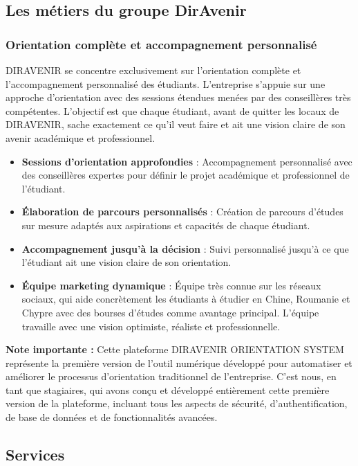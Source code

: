 \documentclass[12pt,a4paper]{report}
\begin{document}
\subsection{Les métiers du groupe DirAvenir}

\subsubsection{Orientation complète et accompagnement personnalisé}

DIRAVENIR se concentre exclusivement sur l'orientation complète et l'accompagnement personnalisé des étudiants. L'entreprise s'appuie sur une approche d'orientation avec des sessions étendues menées par des conseillères très compétentes. L'objectif est que chaque étudiant, avant de quitter les locaux de DIRAVENIR, sache exactement ce qu'il veut faire et ait une vision claire de son avenir académique et professionnel.

\begin{itemize}
    \item \textbf{Sessions d'orientation approfondies} : Accompagnement personnalisé avec des conseillères expertes pour définir le projet académique et professionnel de l'étudiant.
    \item \textbf{Élaboration de parcours personnalisés} : Création de parcours d'études sur mesure adaptés aux aspirations et capacités de chaque étudiant.
    \item \textbf{Accompagnement jusqu'à la décision} : Suivi personnalisé jusqu'à ce que l'étudiant ait une vision claire de son orientation.
    \item \textbf{Équipe marketing dynamique} : Équipe très connue sur les réseaux sociaux, qui aide concrètement les étudiants à étudier en Chine, Roumanie et Chypre avec des bourses d'études comme avantage principal. L'équipe travaille avec une vision optimiste, réaliste et professionnelle.
\end{itemize}

\textbf{Note importante :} Cette plateforme DIRAVENIR ORIENTATION SYSTEM représente la première version de l'outil numérique développé pour automatiser et améliorer le processus d'orientation traditionnel de l'entreprise. C'est nous, en tant que stagiaires, qui avons conçu et développé entièrement cette première version de la plateforme, incluant tous les aspects de sécurité, d'authentification, de base de données et de fonctionnalités avancées.


\subsection{Services}
\end{document}
